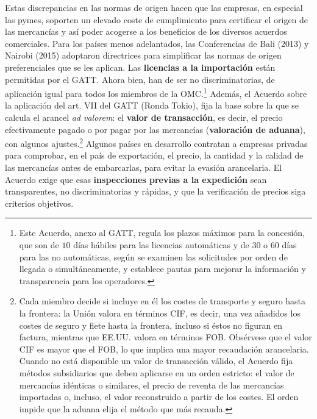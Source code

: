 \documentclass[10pt,a4paper]{article}
\newcounter{anexo}
\begin{document}
{  Estas discrepancias en las normas de origen hacen que las empresas, en especial las pymes, soporten un elevado coste de cumplimiento para certificar el origen de las mercancías y así poder acogerse a los beneficios de los diversos acuerdos comerciales. Para los países menos adelantados, las Conferencias de Bali (2013) y Nairobi (2015) adoptaron directrices para simplificar las normas de origen preferenciales que se les aplican.
} Las \textbf{licencias a la importación} están permitidas por el GATT. Ahora bien, han de ser no discriminatorias, de aplicación igual para todos los miembros de la OMC.\footnote{%
  Este Acuerdo, anexo al GATT, regula los plazos máximos para la concesión, que son de $10$ días hábiles para las licencias automáticas y de $30$ o $60$ días para las no automáticas, según se examinen las solicitudes por orden de llegada o simultáneamente, y establece pautas para mejorar la información y transparencia para los operadores.
} Además, el Acuerdo sobre la aplicación del art. VII del GATT (Ronda Tokio), fija la base sobre la que se calcula el arancel \textit{ad valorem}: el \textbf{valor de transacción}, es decir, el precio efectivamente pagado o por pagar por las mercancías (\textbf{valoración de aduana}), con algunos ajustes.\footnote{%
  Cada miembro decide si incluye en él los costes de transporte y seguro hasta la frontera: la Unión valora en términos CIF, es decir, una vez añadidos los costes de seguro y flete hasta la frontera, incluso si éstos no figuran en factura, mientras que EE.UU. valora en términos FOB. Obsérvese que el valor CIF es mayor que el FOB, lo que implica una mayor recaudación arancelaria. Cuando no está disponible un valor de transacción válido, el Acuerdo fija métodos subsidiarios que deben aplicarse en un orden estricto: el valor de mercancías idénticas o similares, el precio de reventa de las mercancías importadas o, incluso, el valor reconstruido a partir de los costes. El orden impide que la aduana elija el método que más recauda.
} Algunos países en desarrollo contratan a empresas privadas para comprobar, en el país de exportación, el precio, la cantidad y la calidad de las mercancías antes de embarcarlas, para evitar la evasión arancelaria. El Acuerdo exige que esas \textbf{inspecciones previas a la expedición} sean transparentes, no discriminatorias y rápidas, y que la verificación de precios siga criterios objetivos.
\end{document}
